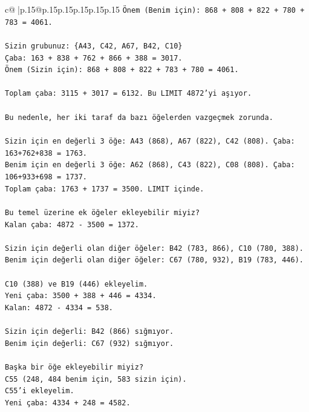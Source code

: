 \documentclass{article}
\begin{document}
{\begin{supertabular}{c@{$\;$}|p{.15\linewidth}@{}p{.15\linewidth}p{.15\linewidth}p{.15\linewidth}p{.15\linewidth}p{.15\linewidth}}
{{{\texttt{Önem (Benim için): 868 + 808 + 822 + 780 + 783 = 4061.} \\
\\ 
\texttt{Sizin grubunuz: \{A43, C42, A67, B42, C10\}} \\
\texttt{Çaba: 163 + 838 + 762 + 866 + 388 = 3017.} \\
\texttt{Önem (Sizin için): 868 + 808 + 822 + 783 + 780 = 4061.} \\
\\ 
\texttt{Toplam çaba: 3115 + 3017 = 6132. Bu LIMIT 4872'yi aşıyor.} \\
\\ 
\texttt{Bu nedenle, her iki taraf da bazı öğelerden vazgeçmek zorunda.} \\
\\ 
\texttt{Sizin için en değerli 3 öğe: A43 (868), A67 (822), C42 (808). Çaba: 163+762+838 = 1763.} \\
\texttt{Benim için en değerli 3 öğe: A62 (868), C43 (822), C08 (808). Çaba: 106+933+698 = 1737.} \\
\texttt{Toplam çaba: 1763 + 1737 = 3500. LIMIT içinde.} \\
\\ 
\texttt{Bu temel üzerine ek öğeler ekleyebilir miyiz?} \\
\texttt{Kalan çaba: 4872 {-} 3500 = 1372.} \\
\\ 
\texttt{Sizin için değerli olan diğer öğeler: B42 (783, 866), C10 (780, 388).} \\
\texttt{Benim için değerli olan diğer öğeler: C67 (780, 932), B19 (783, 446).} \\
\\ 
\texttt{C10 (388) ve B19 (446) ekleyelim.} \\
\texttt{Yeni çaba: 3500 + 388 + 446 = 4334.} \\
\texttt{Kalan: 4872 {-} 4334 = 538.} \\
\\ 
\texttt{Sizin için değerli: B42 (866) sığmıyor.} \\
\texttt{Benim için değerli: C67 (932) sığmıyor.} \\
\\ 
\texttt{Başka bir öğe ekleyebilir miyiz?} \\
\texttt{C55 (248, 484 benim için, 583 sizin için).} \\
\texttt{C55'i ekleyelim.} \\
\texttt{Yeni çaba: 4334 + 248 = 4582.} \\
}}}
\end{supertabular}}
\end{document}
